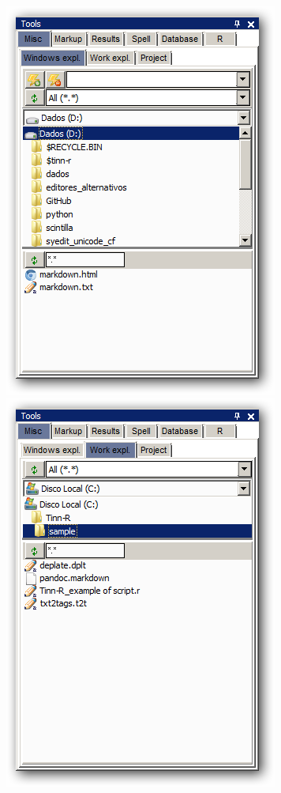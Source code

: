 \begin{figure}[h!]
  \includegraphics[scale=0.35]{./res/tools_misc_windowsexpl.png}~~
  \includegraphics[scale=0.35]{./res/tools_misc_workexpl.png}~~

\end{figure}
